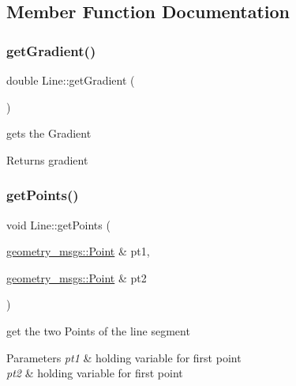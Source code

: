 \subsection{Member Function Documentation}
\mbox{\label{classLine_a872b756c94ed478d05e430ebb436b116}} 
\subsubsection{\texorpdfstring{get\+Gradient()}{getGradient()}}
{\footnotesize\ttfamily double Line\+::get\+Gradient (\begin{DoxyParamCaption}{ }\end{DoxyParamCaption})}



gets the Gradient 

\begin{DoxyReturn}{Returns}
gradient 
\end{DoxyReturn}
\mbox{\label{classLine_acc07117e5463e70ee1159b55d5dc4502}} 
\subsubsection{\texorpdfstring{get\+Points()}{getPoints()}}
{\footnotesize\ttfamily void Line\+::get\+Points (\begin{DoxyParamCaption}\item[{\hyperlink{structgeometry__msgs_1_1Point}{geometry\+\_\+msgs\+::\+Point} \&}]{pt1,  }\item[{\hyperlink{structgeometry__msgs_1_1Point}{geometry\+\_\+msgs\+::\+Point} \&}]{pt2 }\end{DoxyParamCaption})}



get the two Points of the line segment 


\begin{DoxyParams}{Parameters}
{\em pt1} & holding variable for first point \\
\hline
{\em pt2} & holding variable for first point \\
\hline
\end{DoxyParams}
\mbox{\label{classLine_ac3bf0f79e9748a26ad1dd347fe97da75}} 
